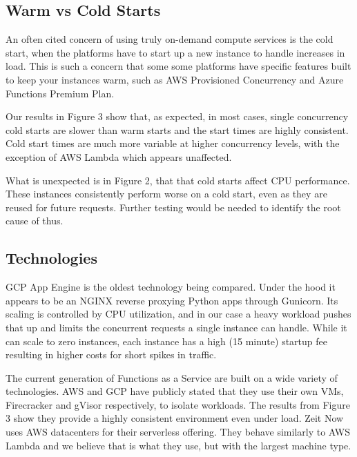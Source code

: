 \documentclass[11pt]{article}
\begin{document}
\subsection{Warm vs Cold Starts}
An often cited concern of using truly on-demand compute services is the cold start,
when the platforms have to start up a new instance to handle increases in load.
This is such a concern that some some platforms have specific features
built to keep your instances warm, such as AWS Provisioned Concurrency %
and Azure Functions Premium Plan.

Our results in Figure 3 %
show that, as expected, in most cases,
single concurrency cold starts are slower than warm starts
and the start times are highly consistent.
Cold start times are much more variable at higher concurrency levels,
with the exception of AWS Lambda which appears unaffected.

What is unexpected is in Figure 2, %
that that cold starts affect CPU performance.
These instances consistently perform worse on a cold start,
even as they are reused for future requests.
Further testing would be needed to identify the root cause of thus.

\subsection{Technologies}
GCP App Engine is the oldest technology being compared.
Under the hood it appears to be an NGINX reverse proxying Python apps through Gunicorn.
Its scaling is controlled by CPU utilization,
and in our case a heavy workload pushes that up
and limits the concurrent requests a single instance can handle.
While it can scale to zero instances,
each instance has a high (15 minute) startup fee %
resulting in higher costs for short spikes in traffic.

The current generation of Functions as a Service
are built on a wide variety of technologies.
AWS and GCP have publicly stated that they use their own VMs,
Firecracker and gVisor respectively, to isolate workloads.
The results from Figure 3 %
show they provide a highly consistent environment even under load.
Zeit Now uses AWS datacenters %
for their serverless offering.
They behave similarly to AWS Lambda
and we believe that is what they use, but with the largest machine type.
\end{document}

